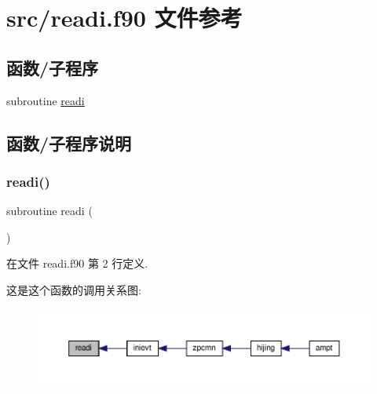 \hypertarget{readi_8f90}{}\section{src/readi.f90 文件参考}
\label{readi_8f90}
\subsection*{函数/子程序}
\begin{DoxyCompactItemize}
\item 
subroutine \mbox{\hyperlink{readi_8f90_a745867f5e3f40e142b4bf43d5aa65e8e}{readi}}
\end{DoxyCompactItemize}


\subsection{函数/子程序说明}
\mbox{\label{readi_8f90_a745867f5e3f40e142b4bf43d5aa65e8e}} 
\subsubsection{\texorpdfstring{readi()}{readi()}}
{\footnotesize\ttfamily subroutine readi (\begin{DoxyParamCaption}{ }\end{DoxyParamCaption})}



在文件 readi.\+f90 第 2 行定义.

这是这个函数的调用关系图\+:
\nopagebreak
\begin{figure}[H]
\begin{center}
\leavevmode
\includegraphics[width=350pt]{readi_8f90_a745867f5e3f40e142b4bf43d5aa65e8e_icgraph}
\end{center}
\end{figure}
